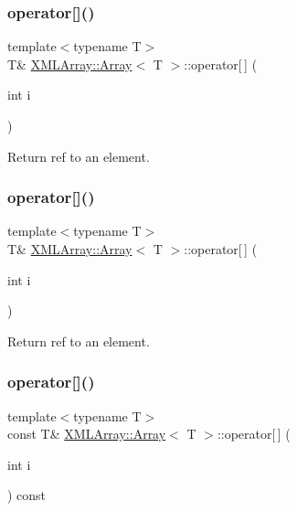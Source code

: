 \subsubsection{\texorpdfstring{operator[]()}{operator[]()}\hspace{0.1cm}{\footnotesize\ttfamily [1/4]}}
{\footnotesize\ttfamily template$<$typename T$>$ \\
T\& \mbox{\hyperlink{classXMLArray_1_1Array}{X\+M\+L\+Array\+::\+Array}}$<$ T $>$\+::operator\mbox{[}$\,$\mbox{]} (\begin{DoxyParamCaption}\item[{int}]{i }\end{DoxyParamCaption})\hspace{0.3cm}{\ttfamily [inline]}}



Return ref to an element. 

\mbox{\label{classXMLArray_1_1Array_a42dbfab67d875b6fa456cade78f70f8f}} 
\subsubsection{\texorpdfstring{operator[]()}{operator[]()}\hspace{0.1cm}{\footnotesize\ttfamily [2/4]}}
{\footnotesize\ttfamily template$<$typename T$>$ \\
T\& \mbox{\hyperlink{classXMLArray_1_1Array}{X\+M\+L\+Array\+::\+Array}}$<$ T $>$\+::operator\mbox{[}$\,$\mbox{]} (\begin{DoxyParamCaption}\item[{int}]{i }\end{DoxyParamCaption})\hspace{0.3cm}{\ttfamily [inline]}}



Return ref to an element. 

\mbox{\label{classXMLArray_1_1Array_a8e51d308c4e6b81cdbf1be40377afda8}} 
\subsubsection{\texorpdfstring{operator[]()}{operator[]()}\hspace{0.1cm}{\footnotesize\ttfamily [3/4]}}
{\footnotesize\ttfamily template$<$typename T$>$ \\
const T\& \mbox{\hyperlink{classXMLArray_1_1Array}{X\+M\+L\+Array\+::\+Array}}$<$ T $>$\+::operator\mbox{[}$\,$\mbox{]} (\begin{DoxyParamCaption}\item[{int}]{i }\end{DoxyParamCaption}) const\hspace{0.3cm}{\ttfamily [inline]}}



